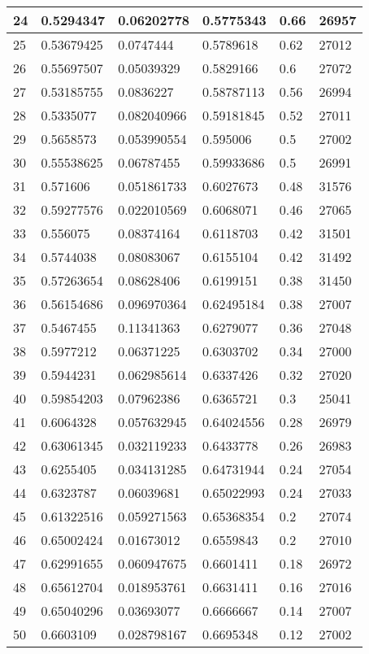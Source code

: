 \begin{longtable}{|l|l|l|l|l|l|}
24 & 0.5294347 & 0.06202778 & 0.5775343 & 0.66 & 26957 \\ \hline 
25 & 0.53679425 & 0.0747444 & 0.5789618 & 0.62 & 27012 \\ \hline 
26 & 0.55697507 & 0.05039329 & 0.5829166 & 0.6 & 27072 \\ \hline 
27 & 0.53185755 & 0.0836227 & 0.58787113 & 0.56 & 26994 \\ \hline 
28 & 0.5335077 & 0.082040966 & 0.59181845 & 0.52 & 27011 \\ \hline 
29 & 0.5658573 & 0.053990554 & 0.595006 & 0.5 & 27002 \\ \hline 
30 & 0.55538625 & 0.06787455 & 0.59933686 & 0.5 & 26991 \\ \hline 
31 & 0.571606 & 0.051861733 & 0.6027673 & 0.48 & 31576 \\ \hline 
32 & 0.59277576 & 0.022010569 & 0.6068071 & 0.46 & 27065 \\ \hline 
33 & 0.556075 & 0.08374164 & 0.6118703 & 0.42 & 31501 \\ \hline 
34 & 0.5744038 & 0.08083067 & 0.6155104 & 0.42 & 31492 \\ \hline 
35 & 0.57263654 & 0.08628406 & 0.6199151 & 0.38 & 31450 \\ \hline 
36 & 0.56154686 & 0.096970364 & 0.62495184 & 0.38 & 27007 \\ \hline 
37 & 0.5467455 & 0.11341363 & 0.6279077 & 0.36 & 27048 \\ \hline 
38 & 0.5977212 & 0.06371225 & 0.6303702 & 0.34 & 27000 \\ \hline 
39 & 0.5944231 & 0.062985614 & 0.6337426 & 0.32 & 27020 \\ \hline 
40 & 0.59854203 & 0.07962386 & 0.6365721 & 0.3 & 25041 \\ \hline 
41 & 0.6064328 & 0.057632945 & 0.64024556 & 0.28 & 26979 \\ \hline 
42 & 0.63061345 & 0.032119233 & 0.6433778 & 0.26 & 26983 \\ \hline 
43 & 0.6255405 & 0.034131285 & 0.64731944 & 0.24 & 27054 \\ \hline 
44 & 0.6323787 & 0.06039681 & 0.65022993 & 0.24 & 27033 \\ \hline 
45 & 0.61322516 & 0.059271563 & 0.65368354 & 0.2 & 27074 \\ \hline 
46 & 0.65002424 & 0.01673012 & 0.6559843 & 0.2 & 27010 \\ \hline 
47 & 0.62991655 & 0.060947675 & 0.6601411 & 0.18 & 26972 \\ \hline 
48 & 0.65612704 & 0.018953761 & 0.6631411 & 0.16 & 27016 \\ \hline 
49 & 0.65040296 & 0.03693077 & 0.6666667 & 0.14 & 27007 \\ \hline 
50 & 0.6603109 & 0.028798167 & 0.6695348 & 0.12 & 27002 \\ \hline 
\end{longtable}